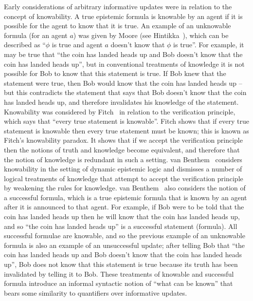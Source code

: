 Early considerations of arbitrary informative updates were in relation to the
concept of knowability. A true epistemic formula is knowable by an agent if it
is possible for the agent to know that it is true. An example of an unknowable
formula (for an agent $a$) was given by Moore (see
Hintikka~\cite{hintikka:1962}), which can be described as ``$\phi$ is true and
agent $a$ doesn't know that $\phi$ is true''. For example, it may be true that
``the coin has landed heads up and Bob doesn't know that the coin has landed
heads up'', but in conventional treatments of knowledge it is not possible for
Bob to know that this statement is true. If Bob knew that the statement were
true, then Bob would know that the coin has landed heads up -- but this
contradicts the statement that says that Bob doesn't know that the coin has
landed heads up, and therefore invalidates his knowledge of the statement.
Knowability was considered by Fitch~\cite{fitch:1963} in relation to the
verification principle, which says that ``every true statement is knowable''. Fitch
shows that if every true statement is knowable then every true statement must be
known; this is known as Fitch's knowability paradox. It shows that if we accept
the verification principle then the notions of truth and knowledge become
equivalent, and therefore that the notion of knowledge is redundant in such a
setting. van Benthem~\cite{vanbenthem:2004} considers knowability in the setting
of dynamic epistemic logic and dismisses a number of logical treatments of
knowledge that attempt to accept the verification principle by weakening the
rules for knowledge. van Benthem~\cite{vanbenthem:2004} also considers the notion
of a successful formula, which is a true epistemic formula that is known by an
agent after it is announced to that agent. For example, if Bob were to be told
that the coin has landed heads up then he will know that the coin has landed
heads up, and so ``the coin has landed heads up'' is a successful statement
(formula). All successful formulae are knowable, and so the previous example of
an unknowable formula is also an example of an unsuccessful update; after
telling Bob that ``the coin has landed heads up and Bob doesn't know that the
coin has landed heads up'', Bob does not know that this statement is true
because its truth has been invalidated by telling it to Bob. These treatments of
knowable and successful formula introduce an informal syntactic notion of ``what
can be known'' that bears some similarity to quantifiers over informative
updates.

